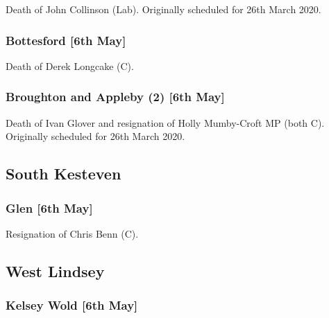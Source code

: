 \documentclass[a4paper,openany]{book}
\begin{document}
\begin{resultsiii}
Death of John Collinson (Lab).  Originally scheduled for 26th March 2020.

\subsubsection*{Bottesford \hspace*{\fill}\nolinebreak[1]%
	\enspace\hspace*{\fill}
	[6th May]}


Death of Derek Longcake (C).

\subsubsection*{Broughton and Appleby (2) \hspace*{\fill}\nolinebreak[1]%
	\enspace\hspace*{\fill}
	[6th May]}


Death of Ivan Glover and resignation of Holly Mumby-Croft MP (both C).  Originally scheduled for 26th March 2020.

\subsection*{South Kesteven}

\subsubsection*{Glen \hspace*{\fill}\nolinebreak[1]%
	\enspace\hspace*{\fill}
	[6th May]}


Resignation of Chris Benn (C).

\subsection*{West Lindsey}

\subsubsection*{Kelsey Wold \hspace*{\fill}\nolinebreak[1]%
	\enspace\hspace*{\fill}
	[6th May]}


\end{resultsiii}
\end{document}
